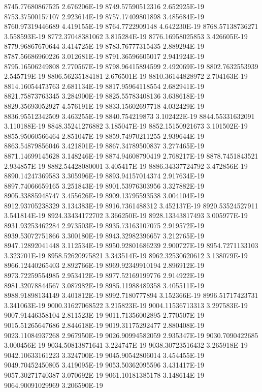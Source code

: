 8745.77680867525  2.676206E-19
8749.57590512316  2.652925E-19
8753.37500157107  2.923614E-19
8757.17409801898  3.485684E-19
8760.97319446689  4.419155E-19
8764.7722909148  4.642230E-19
8768.57138736271  3.558593E-19
8772.37048381062  3.815284E-19
8776.16958025853  3.426605E-19
8779.96867670644  3.414725E-19
8783.76777315435  2.889294E-19
8787.56686960226  3.012681E-19
8791.36596605017  2.941924E-19
8795.16506249808  2.770567E-19
8798.96415894599  2.492069E-19
8802.7632553939  2.545719E-19
8806.56235184181  2.676501E-19
8810.36144828972  2.704163E-19
8814.16054473763  2.681134E-19
8817.95964118554  2.682941E-19
8821.75873763345  3.284900E-19
8825.55783408136  3.638618E-19
8829.35693052927  4.576191E-19
8833.15602697718  4.032429E-19
8836.95512342509  3.463255E-19
8840.754219873  3.102422E-19
8844.55331632091  3.110188E-19
8848.35241276882  3.185047E-19
8852.15150921673  3.101502E-19
8855.95060566464  2.851047E-19
8859.74970211255  2.939644E-19
8863.54879856046  3.421801E-19
8867.34789500837  3.277465E-19
8871.14699145628  3.148246E-19
8874.94608790419  2.768217E-19
8878.7451843521  2.934857E-19
8882.54428080001  3.405417E-19
8886.34337724792  3.472856E-19
8890.14247369583  3.305996E-19
8893.94157014374  2.917634E-19
8897.74066659165  3.251843E-19
8901.53976303956  3.327882E-19
8905.33885948747  3.455626E-19
8909.13795593538  3.004104E-19
8912.93705238329  3.134383E-19
8916.7361488312  3.452137E-19
8920.53524527911  3.541814E-19
8924.33434172702  3.366250E-19
8928.13343817493  3.005977E-19
8931.93253462284  2.973503E-19
8935.73163107075  2.919572E-19
8939.53072751866  3.300180E-19
8943.32982396657  3.212765E-19
8947.12892041448  3.112534E-19
8950.92801686239  2.900727E-19
8954.7271133103  3.323701E-19
8958.52620975821  3.343514E-19
8962.32530620612  3.138079E-19
8966.12440265403  2.892766E-19
8969.92349910194  2.896912E-19
8973.72259554985  2.953412E-19
8977.52169199776  2.914922E-19
8981.32078844567  3.087982E-19
8985.11988489358  3.405511E-19
8988.91898134149  3.401812E-19
8992.7180777894  3.152366E-19
8996.51717423731  3.341063E-19
9000.31627068522  3.215823E-19
9004.11536713313  3.297583E-19
9007.91446358104  2.811523E-19
9011.71356002895  2.770507E-19
9015.51265647686  2.844618E-19
9019.31175292477  2.880408E-19
9023.11084937268  2.967950E-19
9026.90994582059  2.935347E-19
9030.7090422685  3.000456E-19
9034.50813871641  3.224747E-19
9038.30723516432  3.265918E-19
9042.10633161223  3.324700E-19
9045.90542806014  3.454455E-19
9049.70452450805  3.419095E-19
9053.50362095596  3.431417E-19
9057.30271740387  3.070692E-19
9061.10181385178  3.148614E-19
9064.90091029969  3.206590E-19
